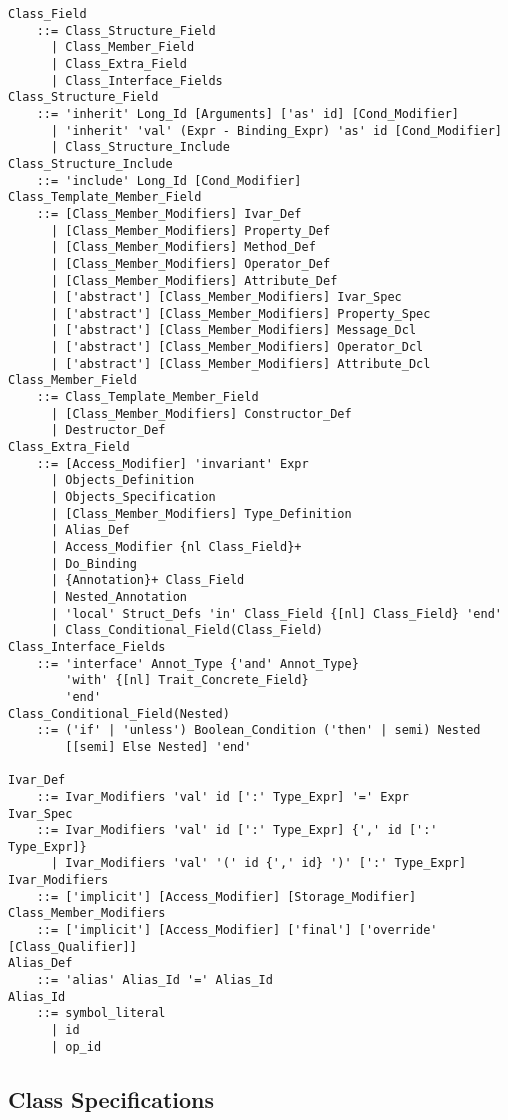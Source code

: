\begin{lstlisting}
Class_Field
    ::= Class_Structure_Field
      | Class_Member_Field
      | Class_Extra_Field
      | Class_Interface_Fields
Class_Structure_Field
    ::= 'inherit' Long_Id [Arguments] ['as' id] [Cond_Modifier]
      | 'inherit' 'val' (Expr - Binding_Expr) 'as' id [Cond_Modifier]
      | Class_Structure_Include
Class_Structure_Include
    ::= 'include' Long_Id [Cond_Modifier]
Class_Template_Member_Field
    ::= [Class_Member_Modifiers] Ivar_Def
      | [Class_Member_Modifiers] Property_Def
      | [Class_Member_Modifiers] Method_Def
      | [Class_Member_Modifiers] Operator_Def
      | [Class_Member_Modifiers] Attribute_Def
      | ['abstract'] [Class_Member_Modifiers] Ivar_Spec
      | ['abstract'] [Class_Member_Modifiers] Property_Spec
      | ['abstract'] [Class_Member_Modifiers] Message_Dcl
      | ['abstract'] [Class_Member_Modifiers] Operator_Dcl
      | ['abstract'] [Class_Member_Modifiers] Attribute_Dcl
Class_Member_Field
    ::= Class_Template_Member_Field
      | [Class_Member_Modifiers] Constructor_Def
      | Destructor_Def
Class_Extra_Field
    ::= [Access_Modifier] 'invariant' Expr
      | Objects_Definition
      | Objects_Specification
      | [Class_Member_Modifiers] Type_Definition
      | Alias_Def
      | Access_Modifier {nl Class_Field}+
      | Do_Binding
      | {Annotation}+ Class_Field
      | Nested_Annotation
      | 'local' Struct_Defs 'in' Class_Field {[nl] Class_Field} 'end'
      | Class_Conditional_Field(Class_Field)
Class_Interface_Fields
    ::= 'interface' Annot_Type {'and' Annot_Type}
        'with' {[nl] Trait_Concrete_Field}
        'end'
Class_Conditional_Field(Nested)
    ::= ('if' | 'unless') Boolean_Condition ('then' | semi) Nested
        [[semi] Else Nested] 'end'

Ivar_Def
    ::= Ivar_Modifiers 'val' id [':' Type_Expr] '=' Expr
Ivar_Spec
    ::= Ivar_Modifiers 'val' id [':' Type_Expr] {',' id [':' Type_Expr]}
      | Ivar_Modifiers 'val' '(' id {',' id} ')' [':' Type_Expr]
Ivar_Modifiers
    ::= ['implicit'] [Access_Modifier] [Storage_Modifier]
Class_Member_Modifiers
    ::= ['implicit'] [Access_Modifier] ['final'] ['override' [Class_Qualifier]]
Alias_Def
    ::= 'alias' Alias_Id '=' Alias_Id
Alias_Id 
    ::= symbol_literal
      | id
      | op_id
\end{lstlisting}





\subsection{Class Specifications}
\label{sec:class-specs}

